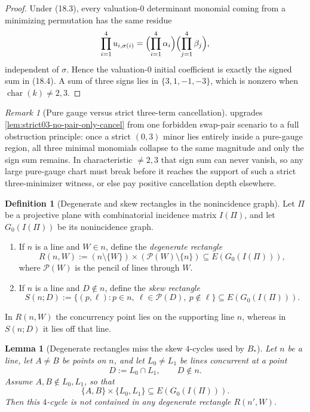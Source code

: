 \documentclass[11pt]{amsart}
\numberwithin{equation}{section}
\theoremstyle{plain}
\newtheorem{lemma}[theorem]{Lemma}
\theoremstyle{definition}
\newtheorem{definition}[theorem]{Definition}
\theoremstyle{remark}
\newtheorem{remark}[theorem]{Remark}
\begin{document}
\begin{proof}
Under \textup{(18.3)}, every valuation-$0$ determinant monomial coming from a minimizing permutation has the same residue
\[
\prod_{i=1}^4 u_{i,\sigma(i)}=\Bigl(\prod_{i=1}^4 \alpha_i\Bigr)\Bigl(\prod_{j=1}^4 \beta_j\Bigr),
\]
independent of $\sigma$. Hence the valuation-$0$ initial coefficient is exactly the signed sum in \textup{(18.4)}. A sum of three signs
lies in $\{3,1,-1,-3\}$, which is nonzero when $\operatorname{char}(k)\neq 2,3$.
\end{proof}

\begin{remark}[Pure gauge versus strict three-term cancellation]
\label{rem:puregauge-vs-strict03}
 upgrades \cref{lem:strict03-no-pair-only-cancel} from one forbidden swap-pair scenario to a full
obstruction principle: once a strict $(0,3)$ minor lies entirely inside a pure-gauge region, all three minimal monomials collapse to the
same magnitude and only the sign sum remains. In characteristic $\neq 2,3$ that sign sum can never vanish, so any large pure-gauge chart
must break before it reaches the support of such a strict three-minimizer witness, or else pay positive cancellation depth elsewhere.
\end{remark}

\begin{definition}[Degenerate and skew rectangles in the nonincidence graph]
\label{def:degenerate-vs-skew-rectangles}
Let $\Pi$ be a projective plane with combinatorial incidence matrix $I(\Pi)$, and let $G_0(I(\Pi))$ be its nonincidence graph.
\begin{enumerate}[leftmargin=2em]
  \item If $n$ is a line and $W\in n$, define the \emph{degenerate rectangle}
  \[
  R(n,W):=(n\setminus\{W\})\times (\mathcal P(W)\setminus\{n\})\subseteq E(G_0(I(\Pi))),
  \]
  where $\mathcal P(W)$ is the pencil of lines through $W$.
  \item If $n$ is a line and $D\notin n$, define the \emph{skew rectangle}
  \[
  S(n;D):=\{(p,\ell): p\in n,\ \ell\in \mathcal P(D),\ p\notin \ell\}\subseteq E(G_0(I(\Pi))).
  \]
\end{enumerate}
In $R(n,W)$ the concurrency point lies on the supporting line $n$, whereas in $S(n;D)$ it lies off that line.
\end{definition}

\begin{lemma}[Degenerate rectangles miss the skew $4$-cycles used by $B_*$]
\label{lem:degenerate-rectangles-miss-skew}
Let $n$ be a line, let $A\neq B$ be points on $n$, and let $L_0\neq L_1$ be lines concurrent at a point
\[
D:=L_0\cap L_1,
\qquad D\notin n.
\]
Assume $A,B\notin L_0,L_1$, so that
\[
\{A,B\}\times\{L_0,L_1\}\subseteq E(G_0(I(\Pi))).
\]
Then this $4$-cycle is not contained in any degenerate rectangle $R(n',W)$.
\end{lemma}
\end{document}
